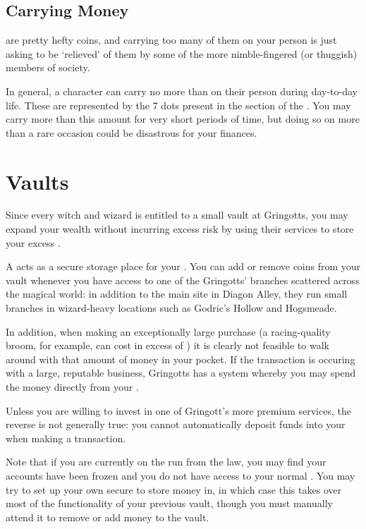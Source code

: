 \subsection{Carrying Money}

 are pretty hefty coins, and carrying too many of them on your person is just asking to be `relieved' of them by some of the more nimble-fingered (or thuggish) members of society. 

In general, a character can carry no more than  on their person during day-to-day life. These are represented by the 7  dots present in the  section of the . You may carry more than this amount for very short periods of time, but doing so on more than a rare occasion could be disastrous for your finances.


\section{Vaults}
Since every witch and wizard is entitled to a small vault at Gringotts, you may expand your wealth without incurring excess risk by using their services to store your excess . 

A  acts as a secure storage place for your . You can add or remove coins from your vault whenever you have access to one of the Gringotts' branches scattered across the magical world: in addition to the main site in Diagon Alley, they run small branches in wizard-heavy locations such as Godric's Hollow and Hogsmeade.  

In addition, when making an exceptionally large purchase (a racing-quality broom, for example, can cost in excess of ) it is clearly not feasible to walk around with that amount of money in your pocket. If the transaction is occuring with a large, reputable business, Gringotts has a system whereby you may spend the money directly from your . 

Unless you are willing to invest in one of Gringott's more premium services, the reverse is not generally true: you cannot automatically deposit funds into your  when making a transaction.  


Note that if you are currently on the run from the law, you may find your accounts have been frozen and you do not have access to your normal . You may try to set up your own secure  to store money in, in which case this takes over most of the functionality of your previous vault, though you must manually attend it to remove or add money to the vault.

